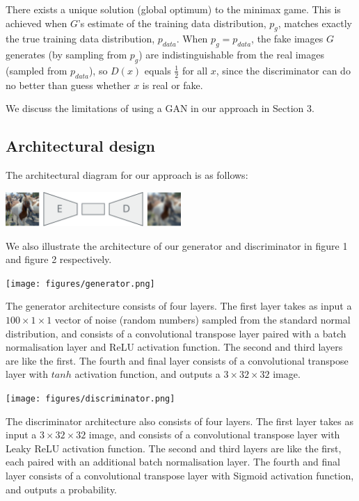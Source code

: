 \documentclass{article}
\begin{document}
There exists a unique solution (global optimum) to the minimax game. This is achieved when $G$'s estimate of the training data distribution, $p_g$, matches exactly the true training data distribution, $p_{data}$. When $p_g = p_{data}$, the fake images $G$ generates (by sampling from $p_g$) are indistinguishable from the real images (sampled from $p_{data}$), so $D(x)$ equals $\frac{1}{2}$ for all $x$, since the discriminator can do no better than guess whether $x$ is real or fake.

We discuss the limitations of using a GAN in our approach in Section 3.

\subsection{Architectural design}
The architectural diagram for our approach is as follows:
\begin{center}
    \includegraphics[width=0.5\textwidth]{figures/architecture.pdf}
\end{center}

We also illustrate the architecture of our generator and discriminator in figure 1 and figure 2 respectively. 

\begin{center}
    \texttt{[image: figures/generator.png]}
\end{center}

The generator architecture consists of four layers. The first layer takes as input a $100 \times 1 \times 1$ vector of noise (random numbers) sampled from the standard normal distribution, and consists of a convolutional transpose layer paired with a batch normalisation layer and ReLU activation function. The second and third layers are like the first. The fourth and final layer consists of a convolutional transpose layer with $tanh$ activation function, and outputs a $3 \times 32 \times 32$ image.  

\begin{center}
    \texttt{[image: figures/discriminator.png]}
\end{center}

The discriminator architecture also consists of four layers. The first layer takes as input a $3 \times 32 \times 32$ image, and consists of a convolutional transpose layer with Leaky ReLU activation function. The second and third layers are like the first, each paired with an additional batch normalisation layer. The fourth and final layer consists of a convolutional transpose layer with Sigmoid activation function, and outputs a probability. 
\end{document}
